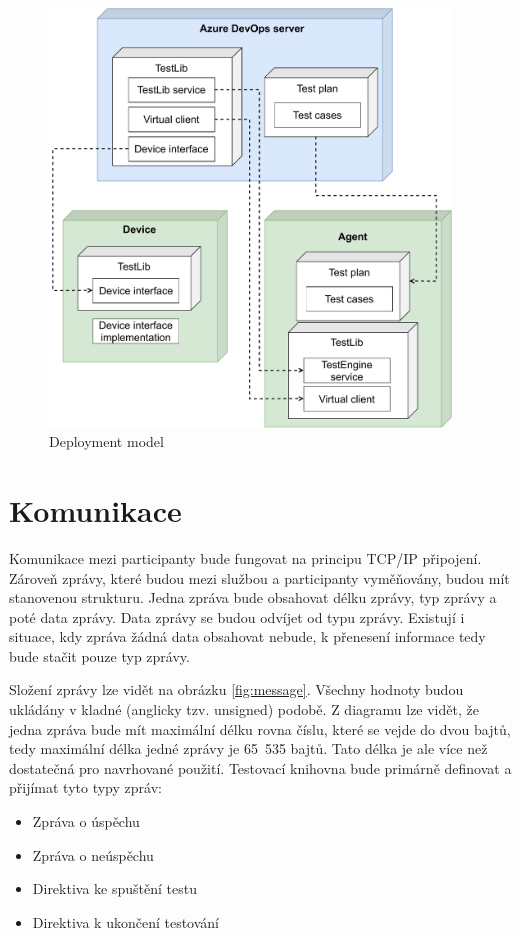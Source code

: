 \begin{figure}[htbp]
    \centering 
    \includegraphics[width=0.95\textwidth]{assets/img/deploymentmodel.pdf}
    \caption{Deployment model}
    \label{fig:deploymodel}
\end{figure}


\section{Komunikace}
Komunikace mezi participanty bude fungovat na principu TCP/IP připojení. Zároveň zprávy, které budou mezi službou a participanty vyměňovány, budou mít stanovenou strukturu. Jedna zpráva bude obsahovat délku zprávy, typ zprávy a poté data zprávy. Data zprávy se budou odvíjet od typu zprávy. Existují i situace, kdy zpráva žádná data obsahovat nebude, k přenesení informace tedy bude stačit pouze typ zprávy. 

Složení zprávy lze vidět na obrázku \ref{fig:message}. Všechny hodnoty budou ukládány v kladné (anglicky tzv. unsigned) podobě. Z diagramu lze vidět, že jedna zpráva bude mít maximální délku rovna číslu, které se vejde do dvou bajtů, tedy maximální délka jedné zprávy je 65~535 bajtů. Tato délka je ale více než dostatečná pro navrhované použití. Testovací knihovna bude primárně definovat a přijímat tyto typy zpráv:

\begin{itemize}
    \item Zpráva o úspěchu
    \item Zpráva o neúspěchu
    \item Direktiva ke spuštění testu
    \item Direktiva k ukončení testování
\end{itemize}

